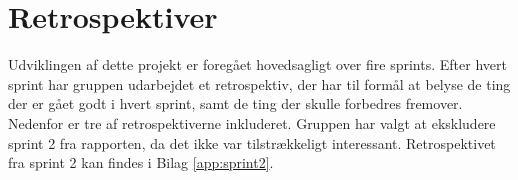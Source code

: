 \section{Retrospektiver}\label{sec:brugafscrum}
Udviklingen af dette projekt er foregået hovedsagligt over fire sprints. Efter hvert sprint har gruppen udarbejdet
et retrospektiv, der har til formål at belyse de ting der er gået godt i hvert sprint, samt de ting der skulle forbedres fremover.
Nedenfor er tre af retrospektiverne inkluderet. Gruppen har valgt at ekskludere sprint 2 fra rapporten, da det ikke var tilstrækkeligt interessant.
Retrospektivet fra sprint 2 kan findes i Bilag \ref{app:sprint2}.





